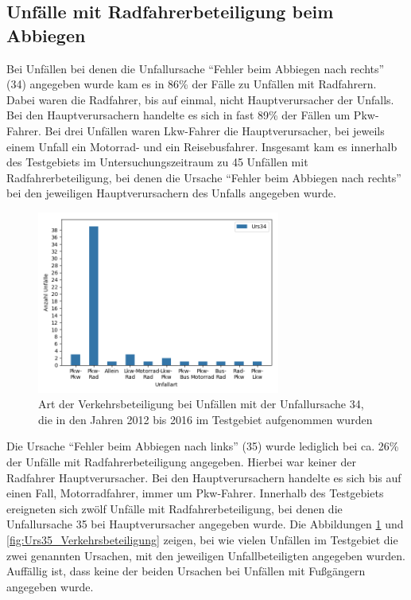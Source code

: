 \subsection{Unfälle mit Radfahrerbeteiligung beim Abbiegen}\label{subsection:Abbiegeunfälle mit Radfahrern}
Bei Unfällen bei denen die Unfallursache \enquote{Fehler beim Abbiegen nach rechts} (34) angegeben wurde kam es in 86\% der Fälle zu Unfällen mit Radfahrern. Dabei waren die Radfahrer, bis auf einmal, nicht Hauptverursacher der Unfalls. Bei den Hauptverursachern handelte es sich in fast 89\% der Fällen um Pkw-Fahrer. Bei drei Unfällen waren Lkw-Fahrer die Hauptverursacher, bei jeweils einem Unfall ein Motorrad- und ein Reisebusfahrer. Insgesamt kam es innerhalb des Testgebiets im Untersuchungszeitraum zu 45 Unfällen mit Radfahrerbeteiligung, bei denen die Ursache \enquote{Fehler beim Abbiegen nach rechts} bei den jeweiligen Hauptverursachern des Unfalls angegeben wurde.

\begin{savenotes}
	\begin{figure}[H]
		\centering
		\includegraphics[width=8cm,height=6cm]{figures/Urs34_Beteiligung}
		\caption[Art der Verkehrsbeteiligung bei Unfällen mit der Unfallursache 34, die in den Jahren 2012 bis 2016 im Testgebiet aufgenommen wurden]{Art der Verkehrsbeteiligung bei Unfällen mit der Unfallursache 34, die in den Jahren 2012 bis 2016 im Testgebiet aufgenommen wurden}\label{fig:Urs34_Verkehrsbeteiligung}
	\end{figure}
\end{savenotes}

Die Ursache \enquote{Fehler beim Abbiegen nach links} (35) wurde lediglich bei ca. 26\% der Unfälle mit Radfahrerbeteiligung angegeben. Hierbei war keiner der Radfahrer Hauptverursacher. Bei den Hauptverursachern handelte es sich bis auf einen Fall, Motorradfahrer, immer um Pkw-Fahrer. Innerhalb des Testgebiets ereigneten sich zwölf Unfälle mit Radfahrerbeteiligung, bei denen die Unfallursache 35 bei Hauptverursacher angegeben wurde. Die Abbildungen \ref{fig:Urs34_Verkehrsbeteiligung} und \ref{fig:Urs35_Verkehrsbeteiligung} zeigen, bei wie vielen Unfällen im Testgebiet die zwei genannten Ursachen, mit den jeweiligen Unfallbeteiligten angegeben wurden. Auffällig ist, dass keine der beiden Ursachen bei Unfällen mit Fußgängern angegeben wurde.

